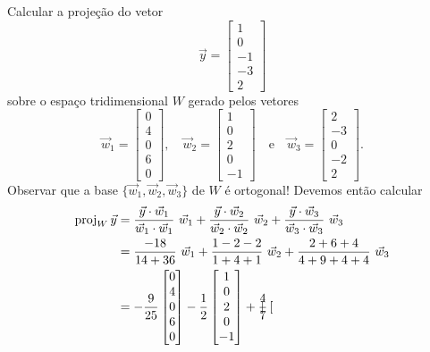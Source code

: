 \documentclass[../livro.tex]{subfiles}  %
\begin{document}
\begin{example}
Calcular a projeção do vetor
\[
\vec{y} =
\begin{bmatrix}
1 \\ 0 \\ -1 \\ -3 \\ 2
\end{bmatrix}
\] sobre o espaço tridimensional $W$ gerado pelos vetores
\[
\vec{w}_1 =
\begin{bmatrix}
 0\\4\\0 \\ 6 \\0
\end{bmatrix}, \quad
\vec{w}_2 =
\begin{bmatrix}
 1\\0\\2\\0\\-1
\end{bmatrix} \quad \text{e} \quad
\vec{w}_3 =
\begin{bmatrix}
 2\\-3\\0\\-2\\ 2
\end{bmatrix}.
\] Observar que a base $\{\vec{w}_1, \vec{w}_2, \vec{w}_3\}$ de $W$ é ortogonal! Devemos então calcular
  \begin{align*}
\proj_W \vec{y} & = \frac{\vec{y} \cdot \vec{w}_1}{\vec{w}_1 \cdot \vec{w}_1} \ \vec{w}_1 + \frac{\vec{y} \cdot \vec{w}_2}{\vec{w}_2 \cdot \vec{w}_2} \ \vec{w}_2 + \frac{\vec{y} \cdot \vec{w}_3}{\vec{w}_3 \cdot \vec{w}_3} \ \vec{w}_3\\
                & = \frac{ -18 }{ 14 + 36 } \ \vec{w}_1 + \frac{ 1 - 2 - 2 }{ 1 + 4 + 1 } \ \vec{w}_2 + \frac{ 2 + 6 + 4 }{ 4 + 9 + 4 + 4 } \ \vec{w}_3 \\
                & = -\frac{9}{25} \begin{bmatrix}
 0\\4\\0 \\ 6 \\0
\end{bmatrix} - \frac{1}{2} \begin{bmatrix}
 1\\0\\2\\0\\-1
\end{bmatrix} + \frac{4}{7} \begin{bmatrix}

\end{bmatrix}
\end{align*}
\end{example}
\end{document}
